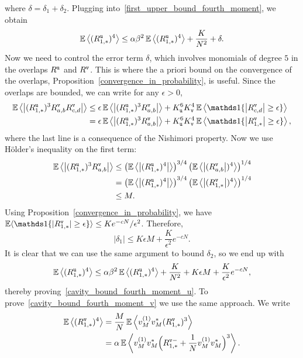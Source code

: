 \documentclass[final,12pt]{colt2018} %
\newcommand{\utt}{\textup{\texttt{u}}}
\newcommand{\vtt}{\textup{\texttt{v}}}
\begin{document}
where $\delta = \delta_1 + \delta_2$. Plugging into~\eqref{first_upper_bound_fourth_moment}, we obtain
\[\E\left \langle (R^{\utt}_{1,*})^4\right \rangle \le \alpha\beta^2\E\left \langle(R^{\utt}_{1,*})^4\right \rangle + \frac{K}{N^2} + \delta.\] 
Now we need to control the error term $\delta$, which involves monomials of degree $5$ in the overlaps $R^\utt$ and $R^\vtt$. This is where the a priori bound on the convergence of the overlaps, Proposition~\ref{convergence_in_probability}, is useful. Since the overlaps are bounded, we can write for any $\epsilon >0$,
\begin{align*}
\E\left \langle \abs{(R^{\utt}_{1,*})^3R^{\vtt}_{a,b}R^{\vtt}_{c,d}}\right \rangle &\le \epsilon \E\left \langle \abs{(R^{\utt}_{1,*})^3R^{\vtt}_{a,b}}\right \rangle + K_\utt^6K_\vtt^4 \E\left \langle \indi\{\abs{R^{\vtt}_{c,d}} \ge \epsilon\} \right \rangle\\
&= \epsilon \E\left \langle \abs{(R^{\utt}_{1,*})^3R^{\vtt}_{a,b}}\right \rangle + K_\utt^6K_\vtt^4 \E\left \langle \indi\{\abs{R^{\vtt}_{1,*}} \ge \epsilon\} \right \rangle,
\end{align*}
where the last line is a consequence of the Nishimori property. Now we use H\"older's inequality on the first term:
\begin{align*}
\E\left \langle \abs{(R^{\utt}_{1,*})^3R^{\vtt}_{a,b}}\right \rangle &\le \left(\E\left \langle \abs{(R^{\utt}_{1,*})^4}\right \rangle\right)^{3/4} \left(\E\left \langle \abs{(R^{\vtt}_{a,b}})^4\right \rangle\right)^{1/4} \\
&=\left(\E\left \langle \abs{(R^{\utt}_{1,*})^4}\right \rangle\right)^{3/4} \left(\E\left \langle \abs{(R^{\vtt}_{1,*}})^4\right \rangle\right)^{1/4}\\
&\le M.
\end{align*}
Using Proposition~\ref{convergence_in_probability}, we have $\E \langle \indi\{|R^{\vtt}_{1,*}| \ge \epsilon\}  \rangle \le K e^{-cN}/\epsilon^2$. Therefore,
\[|\delta_1| \le K\epsilon M + \frac{K}{\epsilon^2} e^{-cN}.\]
It is clear that we can use the same argument to bound $\delta_2$, so we end up with
\[\E\left \langle (R^{\utt}_{1,*})^4\right \rangle \le \alpha\beta^2\E\left \langle(R^{\utt}_{1,*})^4\right \rangle + \frac{K}{N^2} +  K\epsilon M + \frac{K}{\epsilon^2} e^{-cN},\] 
thereby proving~\eqref{cavity_bound_fourth_moment_u}. To prove~\eqref{cavity_bound_fourth_moment_v} we use the same approach. We write
\begin{align*}
\E\left \langle (R^{\vtt}_{1,*})^4\right \rangle &= \frac{M}{N}\E\left \langle v^{(1)}_{M}v^{*}_{M}(R^{\vtt}_{1,*})^3\right \rangle\\
&= \alpha\E\left \langle v^{(1)}_{M}v^{*}_{M}\Big(R^{\vtt-}_{1,*} + \frac{1}{N}v^{(1)}_{M}v^{*}_{M}\Big)^3\right \rangle.
\end{align*}
\end{document}

